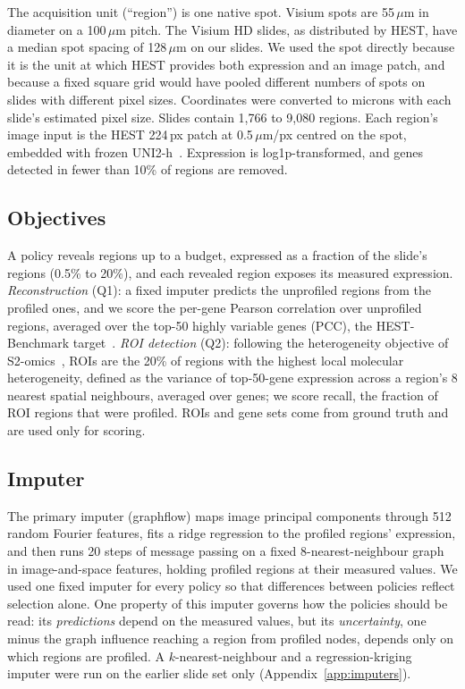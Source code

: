 \documentclass{article}
\begin{document}
The acquisition unit (``region'') is one native spot. Visium spots are 55\,$\mu$m in diameter on a
100\,$\mu$m pitch. The Visium HD slides, as distributed by HEST, have a median spot spacing of 128\,$\mu$m on our
slides. We used the spot directly because it is the unit at which HEST provides both expression and an image
patch, and because a fixed square grid would have pooled different numbers of spots on slides with
different pixel sizes. Coordinates were converted to microns with each slide's estimated pixel size. Slides
contain 1{,}766 to 9{,}080 regions. Each region's image input is the HEST 224\,px patch at 0.5\,$\mu$m/px
centred on the spot, embedded with frozen UNI2-h~\citep{chen2024uni}. Expression is log1p-transformed, and
genes detected in fewer than 10\% of regions are removed.

\subsection{Objectives}
A policy reveals regions up to a budget, expressed as a fraction of the slide's regions (0.5\% to 20\%), and
each revealed region exposes its measured expression. \emph{Reconstruction} (Q1): a fixed imputer predicts
the unprofiled regions from the profiled ones, and we score the per-gene Pearson correlation over unprofiled
regions, averaged over the top-50 highly variable genes (PCC), the HEST-Benchmark target~\citep{jaume2024hest}.
\emph{ROI detection} (Q2): following the heterogeneity objective of S2-omics~\citep{yuan2025s2omics}, ROIs are
the 20\% of regions with the highest local molecular heterogeneity, defined as the variance of top-50-gene
expression across a region's 8 nearest spatial neighbours, averaged over genes; we score recall, the fraction
of ROI regions that were profiled. ROIs and gene sets come from ground truth and are used only for scoring.

\subsection{Imputer}
The primary imputer (graphflow) maps image principal components through 512 random Fourier features, fits a
ridge regression to the profiled regions' expression, and then runs 20 steps of message passing on a fixed
8-nearest-neighbour graph in image-and-space features, holding profiled regions at their measured values.
We used one fixed imputer for every policy so that differences between policies reflect selection alone. One
property of this imputer governs how the policies should be read: its \emph{predictions} depend on the
measured values, but its \emph{uncertainty}, one minus the graph influence reaching a region from profiled
nodes, depends only on which regions are profiled. A $k$-nearest-neighbour and a regression-kriging imputer
were run on the earlier slide set only (Appendix~\ref{app:imputers}).
\end{document}
